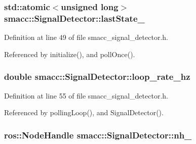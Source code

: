 \subsubsection[{\texorpdfstring{last\+State\+\_\+}{lastState_}}]{\setlength{\rightskip}{0pt plus 5cm}std\+::atomic$<$unsigned long$>$ smacc\+::\+Signal\+Detector\+::last\+State\+\_\+\hspace{0.3cm}{\ttfamily [private]}}\hypertarget{classsmacc_1_1SignalDetector_a72293ed0e98f4200fbe75b53f1e41eab}{}\label{classsmacc_1_1SignalDetector_a72293ed0e98f4200fbe75b53f1e41eab}


Definition at line 49 of file smacc\+\_\+signal\+\_\+detector.\+h.



Referenced by initialize(), and poll\+Once().

\subsubsection[{\texorpdfstring{loop\+\_\+rate\+\_\+hz}{loop_rate_hz}}]{\setlength{\rightskip}{0pt plus 5cm}double smacc\+::\+Signal\+Detector\+::loop\+\_\+rate\+\_\+hz\hspace{0.3cm}{\ttfamily [private]}}\hypertarget{classsmacc_1_1SignalDetector_a41a2ae4262ed350f46d8b886bdc1dfa5}{}\label{classsmacc_1_1SignalDetector_a41a2ae4262ed350f46d8b886bdc1dfa5}


Definition at line 55 of file smacc\+\_\+signal\+\_\+detector.\+h.



Referenced by polling\+Loop(), and Signal\+Detector().

\subsubsection[{\texorpdfstring{nh\+\_\+}{nh_}}]{\setlength{\rightskip}{0pt plus 5cm}ros\+::\+Node\+Handle smacc\+::\+Signal\+Detector\+::nh\+\_\+\hspace{0.3cm}{\ttfamily [private]}}\hypertarget{classsmacc_1_1SignalDetector_a5c416677fd537afc79f2fbc2e68b2dee}{}\label{classsmacc_1_1SignalDetector_a5c416677fd537afc79f2fbc2e68b2dee}


